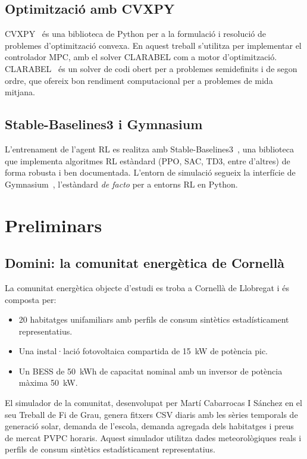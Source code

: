 \documentclass[a4paper,12pt,twoside]{ThesisStyle}
\begin{document}
\section{Optimització amb CVXPY}

CVXPY~\cite{diamond2016cvxpy} és una biblioteca de Python per a la formulació i resolució de problemes d'optimització convexa. En aquest treball s'utilitza per implementar el controlador MPC, amb el solver CLARABEL com a motor d'optimització. CLARABEL~\cite{goulart2024clarabel} és un solver de codi obert per a problemes semidefinits i de segon ordre, que ofereix bon rendiment computacional per a problemes de mida mitjana.

\section{Stable-Baselines3 i Gymnasium}

L'entrenament de l'agent RL es realitza amb Stable-Baselines3~\cite{raffin2021stable}, una biblioteca que implementa algoritmes RL estàndard (PPO, SAC, TD3, entre d'altres) de forma robusta i ben documentada. L'entorn de simulació segueix la interfície de Gymnasium~\cite{towers2024gymnasium}, l'estàndard \textit{de facto} per a entorns RL en Python.


\chapter{Preliminars}
\label{cap:prelim}

\section{Domini: la comunitat energètica de Cornellà}

La comunitat energètica objecte d'estudi es troba a Cornellà de Llobregat i és composta per:
\begin{itemize}
    \item 20 habitatges unifamiliars amb perfils de consum sintètics estadísticament representatius.
    \item Una instal·lació fotovoltaica compartida de 15~kW de potència pic.
    \item Un BESS de 50~kWh de capacitat nominal amb un inversor de potència màxima 50~kW.
\end{itemize}

El simulador de la comunitat, desenvolupat per Martí Cabarrocas I Sánchez en el seu Treball de Fi de Grau, genera fitxers CSV diaris amb les sèries temporals de generació solar, demanda de l'escola, demanda agregada dels habitatges i preus de mercat PVPC horaris. Aquest simulador utilitza dades meteorològiques reals i perfils de consum sintètics estadísticament representatius.
\end{document}
